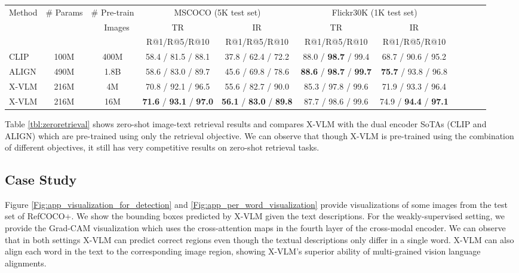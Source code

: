 \documentclass[nohyperref]{article}
\theoremstyle{plain}
\theoremstyle{definition}
\theoremstyle{remark}
\begin{document}
\begin{table*}[h]
	\caption
	{
		Zero-shot results on MSCOCO and Flickr30K datasets. IR: Image Retrieval and TR: Text Retrieval. 
	}
	\label{tbl:zeroretrieval}
    \small
	\centering	
\begin{tabular}	{l  c c |  c  c | c  c  c  c  c  c }
		\toprule	 	
	 \multirow{2}{*}{Method} & \multirow{2}{*}{\# Params} & \# Pre-train & \multicolumn{2}{c|}{MSCOCO (5K test set)} & \multicolumn{2}{c}{Flickr30K (1K test set)} \\
	 & & ~~Images &  TR & IR & TR & IR\\
	 \midrule
	& & & R@1/R@5/R@10 & R@1/R@5/R@10 & R@1/R@5/R@10 & R@1/R@5/R@10\\
	CLIP & 100M & 400M & 58.4 / 81.5 / 88.1 & 37.8 / 62.4 / 72.2 & 88.0 / \textbf{98.7} / 99.4 & 68.7 / 90.6 / 95.2 \\ 
	ALIGN & 490M & 1.8B & 58.6 / 83.0 / 89.7 & 45.6 / 69.8 / 78.6 & \textbf{88.6} / \textbf{98.7} / \textbf{99.7} & \textbf{75.7} / 93.8 / 96.8 \\
	\midrule
	X-VLM & 216M & 4M &  70.8 / 92.1 / 96.5 & 55.6 / 82.7 / 90.0 & 85.3 / 97.8 / 99.6 & 71.9 / 93.3 / 96.4 \\
	X-VLM & 216M & 16M & \textbf{71.6} / \textbf{93.1} / \textbf{97.0} & \textbf{56.1} / \textbf{83.0} / \textbf{89.8} & 87.7 / 98.6 / 99.6 & 74.9 / \textbf{94.4} / \textbf{97.1} \\
		\bottomrule
	\end{tabular}
\end{table*}	


Table \ref{tbl:zeroretrieval} shows zero-shot image-text retrieval results and compares X-VLM with the dual encoder SoTAs (CLIP and ALIGN) which are pre-trained using only the retrieval objective. We can observe that though X-VLM is pre-trained using the combination of different objectives, it still has very competitive results on zero-shot retrieval tasks. 



\subsection{Case Study}
\label{app:pic}

Figure \ref{Fig:app_visualization_for_detection} and \ref{Fig:app_per_word_visualization} provide visualizations of some images from the test set of RefCOCO+. We show the bounding boxes predicted by X-VLM given the text descriptions. For the weakly-supervised setting, we provide the Grad-CAM visualization which uses the cross-attention maps in the fourth layer of the cross-modal encoder. We can observe that in both settings X-VLM can predict correct regions even though the textual descriptions only differ in a single word. X-VLM can also align each word in the text to the corresponding image region, showing X-VLM's superior ability of multi-grained vision language alignments.
\end{document}
